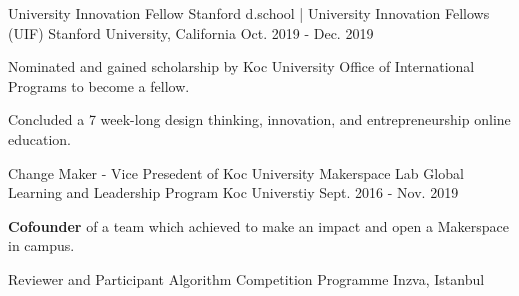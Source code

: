 \begin{cventries}
  \cventry
    {University Innovation Fellow} %
    {Stanford d.school | University Innovation Fellows (UIF)} %
    {Stanford University, California} %
    {Oct. 2019 - Dec. 2019} %
    {
    \begin{cvitems} %
        \item {Nominated and gained scholarship by Koc University Office of International Programs} to become a fellow.
        \item {Concluded a 7 week-long design thinking, innovation, and entrepreneurship online education.}
     \end{cvitems}
    }
    \vspace{2mm}
  \cventry
    {Change Maker - Vice Presedent of Koc University Makerspace Lab} %
    {Global Learning and Leadership Program} %
    {Koc Universtiy} %
    {Sept. 2016 - Nov. 2019} %
    {
      \begin{cvitems} %
        \item {\textbf{Cofounder} of a team which achieved to make an impact and open a Makerspace in campus.}
      \end{cvitems}
    }
    \vspace{2mm}
  \cventry
    {Reviewer and Participant} %
    {Algorithm Competition Programme} %
    {Inzva, Istanbul} %

\end{cventries}
